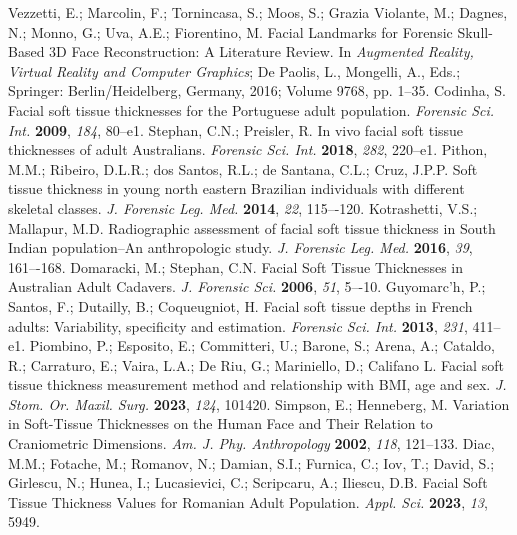 \documentclass[journal,article,submit,pdftex,moreauthors]{Definitions/mdpi}
\begin{document}
\begin{thebibliography}{999}
Vezzetti, E.; Marcolin, F.; Tornincasa, S.; Moos, S.; Grazia Violante, M.; Dagnes, N.; Monno, G.; Uva, A.E.; Fiorentino, M. Facial Landmarks for Forensic Skull-Based 3D Face Reconstruction: A Literature Review. In {\em Augmented Reality, Virtual Reality and Computer Graphics}; De Paolis, L., Mongelli, A., Eds.; Springer: Berlin/Heidelberg, Germany, 2016; Volume 9768, pp. 1--35.
Codinha, S. Facial soft tissue thicknesses for the Portuguese adult population. {\em Forensic Sci. Int.} {\bf 2009}, {\em 184}, 80--e1.
Stephan, C.N.; Preisler, R. In vivo facial soft tissue thicknesses of adult Australians. {\em Forensic Sci. Int.} {\bf 2018}, {\em 282}, 220--e1.
Pithon, M.M.; Ribeiro, D.L.R.; dos Santos, R.L.; de Santana, C.L.; Cruz, J.P.P. Soft tissue thickness in young north eastern Brazilian individuals with different skeletal classes. {\em J. Forensic Leg. Med.} {\bf 2014}, {\em 22}, 115–-120.
Kotrashetti, V.S.; Mallapur, M.D. Radiographic assessment of facial soft tissue thickness in South Indian population--An anthropologic study. {\em J. Forensic Leg. Med.} {\bf 2016}, {\em 39}, 161–-168.
Domaracki, M.; Stephan, C.N. Facial Soft Tissue Thicknesses in Australian Adult Cadavers. {\em J. Forensic Sci.} {\bf 2006}, {\em 51}, 5–-10.
Guyomarc’h, P.; Santos, F.; Dutailly, B.; Coqueugniot, H. Facial soft tissue depths in French adults: Variability, specificity and estimation. {\em Forensic Sci. Int.} {\bf 2013}, {\em 231}, 411--e1.
Piombino, P.; Esposito, E.; Committeri, U.; Barone, S.; Arena, A.; Cataldo, R.; Carraturo, E.; Vaira, L.A.; De Riu, G.; Mariniello, D.; Califano L. Facial soft tissue thickness measurement method and relationship with BMI, age and sex. {\em J. Stom. Or. Maxil. Surg.} {\bf 2023}, {\em 124}, 101420.
Simpson, E.; Henneberg, M. Variation in Soft-Tissue Thicknesses on the Human Face and Their Relation to Craniometric Dimensions. {\em Am. J. Phy. Anthropology} {\bf 2002}, {\em 118}, 121--133.
Diac, M.M.; Fotache, M.; Romanov, N.; Damian, S.I.; Furnica, C.; Iov, T.; David, S.; Girlescu, N.; Hunea, I.; Lucasievici, C.; Scripcaru, A.; Iliescu, D.B. Facial Soft Tissue Thickness Values for Romanian Adult Population. {\em Appl. Sci.} {\bf 2023}, {\em 13}, 5949.

\end{thebibliography}
\end{document}
